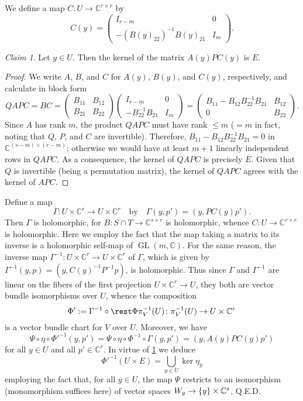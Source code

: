\documentclass[a4paper]{amsart}
\newcommand{\C}{\mathbb{C}}
\theoremstyle{remark}
\newtheorem{claim}{Claim}[question]
\numberwithin{equation}{question}
\DeclarePairedDelimiter\set{\{}{\}}
\DeclareMathOperator{\GL}{GL}
\begin{document}
\begin{solution}
\begin{solenum}
\item We define a map $C \colon U \to \C^{r\times r}$ by
\[
C(y) = \begin{pmatrix}I_{r-m} & 0 \\ -(B(y)_{22})^{-1}B(y)_{21} & I_m\end{pmatrix}.
\]
\begin{claim}
\label{cl:kernel bundle-1}
Let $y \in U$. Then the kernel of the matrix $A(y)PC(y)$ is $E$.
\end{claim}

\begin{proof}
We write $A$, $B$, and $C$ for $A(y)$, $B(y)$, and $C(y)$, respectively, and calculate in block form
\[
QAPC = BC = \begin{pmatrix}B_{11} & B_{12} \\ B_{21} & B_{22}\end{pmatrix} \begin{pmatrix}I_{r-m} & 0 \\ -B_{22}^{-1}B_{21} & I_m\end{pmatrix}
= \begin{pmatrix}B_{11} - B_{12}B_{22}^{-1}B_{21} & B_{12} \\ 0 & B_{22}\end{pmatrix}.
\]
Since $A$ has rank $m$, the product $QAPC$ must have rank $\le m$ ($=m$ in fact, noting that $Q$, $P$, and $C$ are invertible). Therefore, $B_{11} - B_{12}B_{22}^{-1}B_{21} = 0$ in $\C^{(s-m) \times (r-m)}$; otherwise we would have at least $m+1$ linearly independent rows in $QAPC$. As a consequence, the kernel of $QAPC$ is precisely $E$. Given that $Q$ is invertible (being a permutation matrix), the kernel of $QAPC$ agrees with the kernel of $APC$.
\end{proof}

Define a map
\[
\Gamma \colon U \times \C^r \to U \times \C^r \quad \text{by} \quad \Gamma(y,p') = (y,PC(y)p') .
\]
Then $\Gamma$ is holomorphic, for $B \colon S \cap T \to \C^{s\times r}$ is holomorphic, whence $C \colon U \to \C^{r\times r}$ is holomorphic. Here we employ the fact that the map taking a matrix to its inverse is a holomorphic self-map of $\GL(m,\C)$. For the same reason, the inverse map $\Gamma^{-1} \colon U \times \C^r \to U \times \C^r$ of $\Gamma$, which is given by $\Gamma^{-1}(y,p) = (y,C(y)^{-1}P^{-1}p)$, is holomorphic. Thus since $\Gamma$ and $\Gamma^{-1}$ are linear on the fibers of the first projection $U \times \C^r \to U$, they both are vector bundle isomorphisms over $U$, whence the composition
\[
\Phi' := \Gamma^{-1} \circ \rest\Phi{\pi_V^{-1}(U)} \colon \pi_V^{-1}(U) \to U \times \C^r
\]
is a vector bundle chart for $V$ over $U$. Moreover, we have
\[
\Psi \circ \eta \circ \Phi'^{-1}(y,p') = \Psi \circ \eta \circ \Phi^{-1} \circ \Gamma(y,p') = (y,A(y)PC(y)p')
\]
for all $y \in U$ and all $p' \in \C^r$. In virtue of \cref{cl:kernel bundle-1} we deduce
\[
\Phi'^{-1}(U \times E) = \bigcup_{y \in U} \ker \eta_y
\]
employing the fact that, for all $y \in U$, the map $\Psi$ restricts to an isomorphism (monomorphism suffices here) of vector spaces $W_y \to \set y \times \C^s$, Q.E.D.


\end{solenum}
\end{solution}
\end{document}
